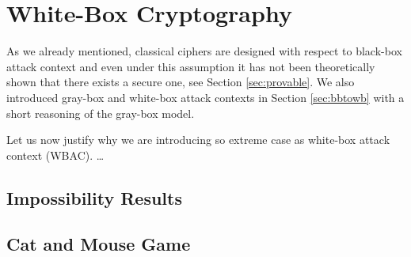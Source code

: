 
\section{White-Box Cryptography}


As we already mentioned, classical ciphers are designed with respect to black-box attack context and even under this assumption it has not been theoretically shown that there exists a secure one, see Section \ref{sec:provable}. We also introduced gray-box and white-box attack contexts in Section \ref{sec:bbtowb} with a short reasoning of the gray-box model.

Let us now justify why we are introducing so extreme case as white-box attack context (WBAC). \ldots %

\subsection{Impossibility Results}
\label{sec:impos}





\subsection{Cat and Mouse Game}
\label{sec:catmouse}



